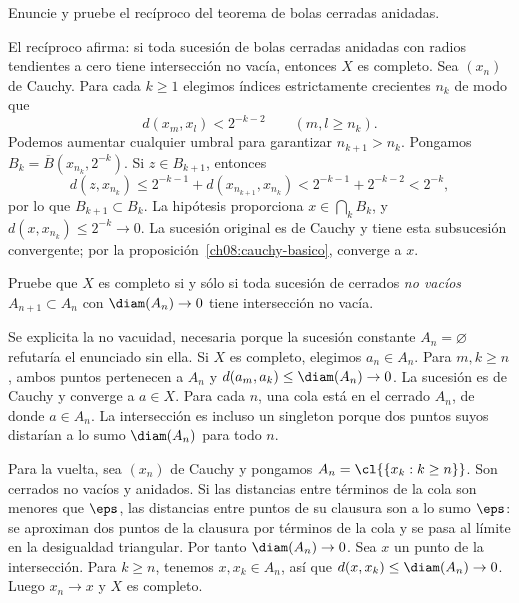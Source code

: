 \begin{ejercicio}
Enuncie y pruebe el recíproco del teorema de bolas cerradas anidadas.
\end{ejercicio}
\begin{solucion}
El recíproco afirma: si toda sucesión de bolas cerradas anidadas con radios tendientes a cero tiene intersección no vacía, entonces $X$ es completo. Sea $(x_n)$ de Cauchy. Para cada $k\geq1$ elegimos índices estrictamente crecientes $n_k$ de modo que
\[
 d(x_m,x_l)<2^{-k-2}\qquad(m,l\geq n_k).
\]
Podemos aumentar cualquier umbral para garantizar $n_{k+1}>n_k$. Pongamos $B_k=\overline B(x_{n_k},2^{-k})$. Si $z\in B_{k+1}$, entonces
\[
 d(z,x_{n_k})\leq2^{-k-1}+d(x_{n_{k+1}},x_{n_k})
 <2^{-k-1}+2^{-k-2}<2^{-k},
\]
por lo que $B_{k+1}\subset B_k$. La hipótesis proporciona $x\in\bigcap_kB_k$, y $d(x,x_{n_k})\leq2^{-k}\to0$. La sucesión original es de Cauchy y tiene esta subsucesión convergente; por la proposición~\ref{ch08:cauchy-basico}, converge a $x$.
\end{solucion}

\begin{ejercicio}
Pruebe que $X$ es completo si y sólo si toda sucesión de cerrados \emph{no vacíos} $A_{n+1}\subset A_n$ con $\diam(A_n)\to0$ tiene intersección no vacía.
\end{ejercicio}
\begin{solucion}
Se explicita la no vacuidad, necesaria porque la sucesión constante $A_n=\varnothing$ refutaría el enunciado sin ella. Si $X$ es completo, elegimos $a_n\in A_n$. Para $m,k\geq n$, ambos puntos pertenecen a $A_n$ y $d(a_m,a_k)\leq\diam(A_n)\to0$. La sucesión es de Cauchy y converge a $a\in X$. Para cada $n$, una cola está en el cerrado $A_n$, de donde $a\in A_n$. La intersección es incluso un singleton porque dos puntos suyos distarían a lo sumo $\diam(A_n)$ para todo $n$.

Para la vuelta, sea $(x_n)$ de Cauchy y pongamos $A_n=\cl{\{x_k:k\geq n\}}$. Son cerrados no vacíos y anidados. Si las distancias entre términos de la cola son menores que $\eps$, las distancias entre puntos de su clausura son a lo sumo $\eps$: se aproximan dos puntos de la clausura por términos de la cola y se pasa al límite en la desigualdad triangular. Por tanto $\diam(A_n)\to0$. Sea $x$ un punto de la intersección. Para $k\geq n$, tenemos $x,x_k\in A_n$, así que $d(x,x_k)\leq\diam(A_n)\to0$. Luego $x_n\to x$ y $X$ es completo.
\end{solucion}

